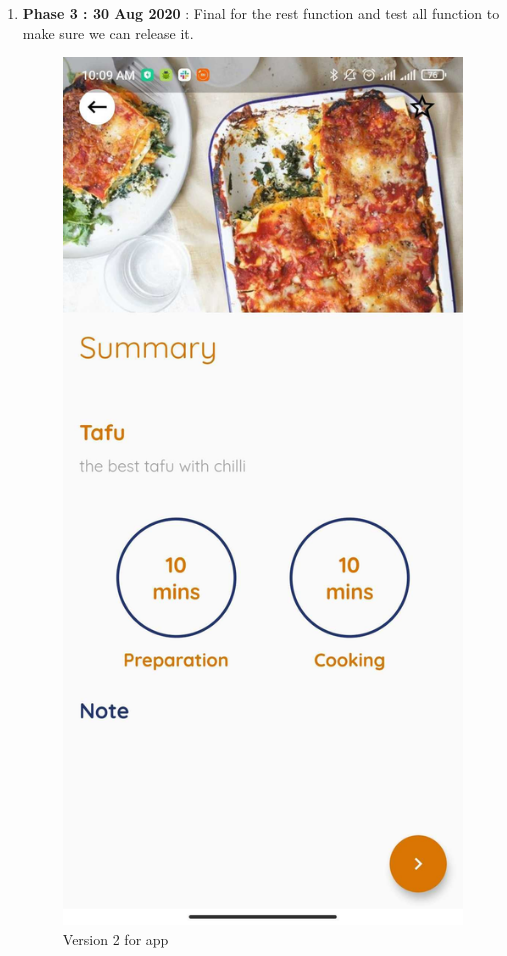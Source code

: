 \documentclass{article}
\begin{document}
\begin{enumerate}
        \item \textbf{Phase 3 : 30 Aug 2020} : Final for the rest function and test all function to make sure we can release it. \\
        \begin{figure}[h!]
        \centering
        \includegraphics[scale=0.1]{Images/Homepage_data.jpg}
        \caption{Version 2 for app}
        \label{fig:cookingbook}
        \end{figure}

    \end{enumerate}
\end{document}
